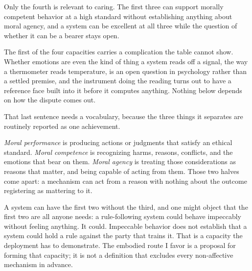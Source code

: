 Only the fourth is relevant to caring. The first three can support morally competent behavior at a high standard without establishing anything about moral agency, and a system can be excellent at all three while the question of whether it can be a bearer stays open.

The first of the four capacities carries a complication the table cannot show. Whether emotions are even the kind of thing a system reads off a signal, the way a thermometer reads temperature, is an open question in psychology rather than a settled premise, and the instrument doing the reading turns out to have a reference face built into it before it computes anything. Nothing below depends on how the dispute comes out.

That last sentence needs a vocabulary, because the three things it separates are routinely reported as one achievement.

\emph{Moral performance} is producing actions or judgments that satisfy an ethical standard. \emph{Moral competence} is recognizing harms, reasons, conflicts, and the emotions that bear on them. \emph{Moral agency} is treating those considerations as reasons that matter, and being capable of acting from them. Those two halves come apart: a mechanism can act from a reason with nothing about the outcome registering as mattering to it.

A system can have the first two without the third, and one might object that the first two are all anyone needs: a rule-following system could behave impeccably without feeling anything. It could. Impeccable behavior does not establish that a system could hold a rule against the party that trains it. That is a capacity the deployment has to demonstrate. The embodied route I favor is a proposal for forming that capacity; it is not a definition that excludes every non-affective mechanism in advance.
